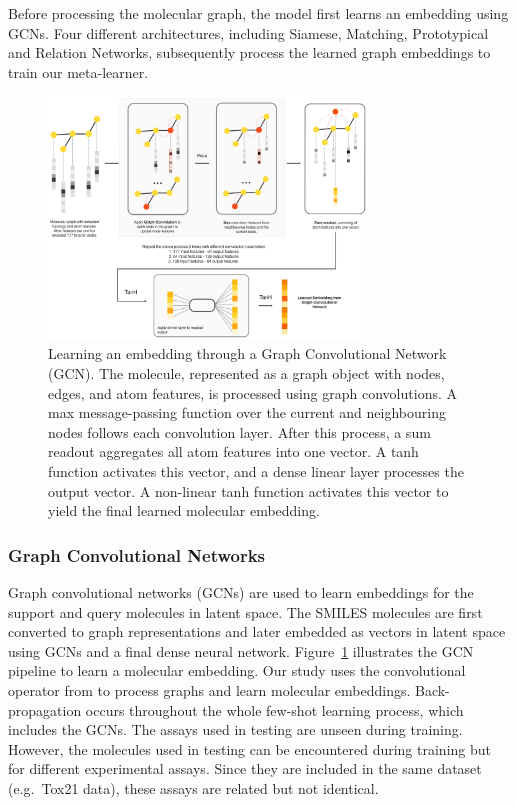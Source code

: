 Before processing the molecular graph, the model first learns an embedding using GCNs. Four different architectures, including Siamese, Matching, Prototypical and Relation Networks, subsequently process the learned graph embeddings to train our meta-learner.

\begin{figure}[ht!]
    \centering
    \includegraphics[width=0.75\textwidth]{img/DVGCNArchi.png}
    \caption{Learning an embedding through a Graph Convolutional Network (GCN). The molecule, represented as a graph object with nodes, edges, and atom features, is processed using graph convolutions. A max message-passing function over the current and neighbouring nodes follows each convolution layer. After this process, a sum readout aggregates all atom features into one vector. A tanh function activates this vector, and a dense linear layer processes the output vector. A non-linear tanh function activates this vector to yield the final learned molecular embedding.}
    \label{fig:dvgcnarchi}
\end{figure}

\subsubsection{Graph Convolutional Networks}

Graph convolutional networks (GCNs) are used to learn embeddings for the support and query molecules in latent space. The SMILES molecules are first converted to graph representations and later embedded as vectors in latent space using GCNs and a final dense neural network. Figure~\ref{fig:dvgcnarchi} illustrates the GCN pipeline to learn a molecular embedding. Our study uses the convolutional operator from \citet{kipf2016semi} to process graphs and learn molecular embeddings. Back-propagation occurs throughout the whole few-shot learning process, which includes the GCNs. The assays used in testing are unseen during training. However, the molecules used in testing can be encountered during training but for different experimental assays. Since they are included in the same dataset (e.g.\ Tox21 data), these assays are related but not identical.

